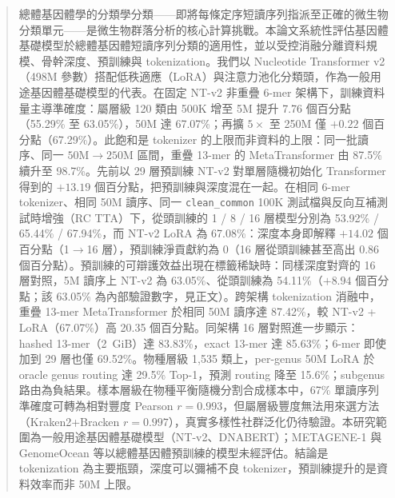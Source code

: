 
\begin{abstract}

    總體基因體學的分類學分類——即將每條定序短讀序列指派至正確的微生物分類單元——是微生物群落分析的核心計算挑戰。本論文系統性評估基因體基礎模型於總體基因體短讀序列分類的適用性，並以受控消融分離資料規模、骨幹深度、預訓練與 tokenization。我們以 Nucleotide Transformer v2（498M 參數）搭配低秩適應（LoRA）與注意力池化分類頭，作為一般用途基因體基礎模型的代表。在固定 NT-v2 非重疊 6-mer 架構下，訓練資料量主導準確度：屬層級 120 類由 500K 增至 5M 提升 7.76 個百分點（55.29\% 至 63.05\%），50M 達 67.07\%；再擴 $5\times$ 至 250M 僅 $+0.22$ 個百分點（67.29\%）。此飽和是 tokenizer 的上限而非資料的上限：同一批讀序、同一 $50\text{M}\to250\text{M}$ 區間，重疊 13-mer 的 MetaTransformer 由 87.5\% 續升至 98.7\%。先前以 29 層預訓練 NT-v2 對單層隨機初始化 Transformer 得到的 $+13.19$ 個百分點，把預訓練與深度混在一起。在相同 6-mer tokenizer、相同 50M 讀序、同一 \texttt{clean\_common} 100K 測試檔與反向互補測試時增強（RC TTA）下，從頭訓練的 1 / 8 / 16 層模型分別為 53.92\% / 65.44\% / 67.94\%，而 NT-v2 LoRA 為 67.08\%：深度本身即解釋 $+14.02$ 個百分點（1$\to$16 層），預訓練淨貢獻約為 0（16 層從頭訓練甚至高出 0.86 個百分點）。預訓練的可辯護效益出現在標籤稀缺時：同樣深度對齊的 16 層對照，5M 讀序上 NT-v2 為 63.05\%、從頭訓練為 54.11\%（$+8.94$ 個百分點；該 63.05\% 為內部驗證數字，見正文）。跨架構 tokenization 消融中，重疊 13-mer MetaTransformer 於相同 50M 讀序達 87.42\%，較 NT-v2 + LoRA（67.07\%）高 20.35 個百分點。同架構 16 層對照進一步顯示：hashed 13-mer（2~GiB）達 83.83\%，exact 13-mer 達 85.63\%；6-mer 即使加到 29 層也僅 69.52\%。物種層級 1,535 類上，per-genus 50M LoRA 於 oracle genus routing 達 29.5\% Top-1，預測 routing 降至 15.6\%；subgenus 路由為負結果。樣本層級在物種平衡隨機分割合成樣本中，67\% 單讀序列準確度可轉為相對豐度 Pearson $r = 0.993$，但屬層級豐度無法用來選方法（Kraken2+Bracken $r = 0.997$），真實多樣性社群泛化仍待驗證。本研究範圍為一般用途基因體基礎模型（NT-v2、DNABERT）；METAGENE-1 與 GenomeOcean 等以總體基因體預訓練的模型未經評估。結論是 tokenization 為主要瓶頸，深度可以彌補不良 tokenizer，預訓練提升的是資料效率而非 50M 上限。

\end{abstract}

